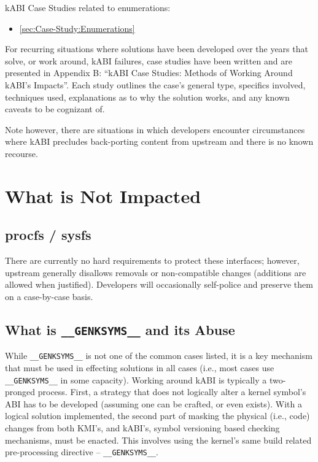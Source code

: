 \documentclass[10pt,oneside,english]{book}
\newcommand*{\fullref}[1]{\hyperref[{#1}]{\autoref*{#1} \nameref*{#1}}}
\begin{document}
kABI Case Studies related to enumerations:
\begin{itemize}
\item \fullref{sec:Case-Study:Enumerations}
\end{itemize}
For recurring situations where solutions have been developed over
the years that solve, or work around, kABI failures, case studies
have been written and are presented in Appendix B: ``kABI Case Studies:
Methods of Working Around kABI's Impacts''. Each study outlines the
case's general type, specifics involved, techniques used, explanations
as to why the solution works, and any known caveats to be cognizant
of.

Note however, there are situations in which developers encounter circumstances
where kABI precludes back-porting content from upstream and there
is no known recourse.

\section{What is Not Impacted}

\subsection{procfs / sysfs}

There are currently no hard requirements to protect these interfaces;
however, upstream generally disallows removals or non-compatible changes
(additions are allowed when justified). Developers will occasionally
self-police and preserve them on a case-by-case basis.

\subsection{What is \texttt{\_\_GENKSYMS\_\_} and its Abuse}

While \texttt{\_\_GENKSYMS\_\_} is not one of the common cases listed,
it is a key mechanism that must be used in effecting solutions in
all cases (i.e., most cases use \texttt{\_\_GENKSYMS\_\_} in some
capacity). Working around kABI is typically a two-pronged process.
First, a strategy that does not logically alter a kernel symbol's
ABI has to be developed (assuming one can be crafted, or even exists).
With a logical solution implemented, the second part of masking the
physical (i.e., code) changes from both KMI's, and kABI's, symbol
versioning based checking mechanisms, must be enacted. This involves
using the kernel's same build related pre-processing directive --
\texttt{\_\_GENKSYMS\_\_}.
\end{document}
